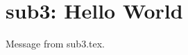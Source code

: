 \documentclass[main]{subfiles}
\begin{document}
\chapter{sub3: Hello World}
Message from sub3.tex.
\end{document}
